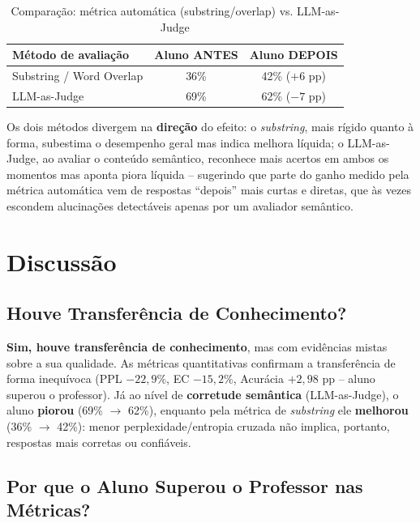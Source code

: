 \documentclass[12pt, a4paper]{article}
\begin{document}
\begin{table}[H]
\centering
\caption{Comparação: métrica automática (substring/overlap) vs. LLM-as-Judge}
\begin{tabular}{lcc}
\toprule
\textbf{Método de avaliação} & \textbf{Aluno ANTES} & \textbf{Aluno DEPOIS} \\
\midrule
Substring / Word Overlap & 36\% & 42\% ($+6$ pp) \\
LLM-as-Judge             & 69\% & 62\% ($-7$ pp) \\
\bottomrule
\end{tabular}
\end{table}

Os dois métodos divergem na \textbf{direção} do efeito: o \textit{substring}, mais
rígido quanto à forma, subestima o desempenho geral mas indica melhora líquida; o
LLM-as-Judge, ao avaliar o conteúdo semântico, reconhece mais acertos em ambos os
momentos mas aponta piora líquida -- sugerindo que parte do ganho medido pela métrica
automática vem de respostas ``depois'' mais curtas e diretas, que às vezes escondem
alucinações detectáveis apenas por um avaliador semântico.

\section{Discussão}

\subsection{Houve Transferência de Conhecimento?}

\begin{destaquebox}
\textbf{Sim, houve transferência de conhecimento}, mas com evidências mistas sobre a
sua qualidade. As métricas quantitativas confirmam a transferência de forma
inequívoca (PPL $-22{,}9\%$, EC $-15{,}2\%$, Acurácia $+2{,}98$ pp -- aluno superou o
professor). Já ao nível de \textbf{corretude semântica} (LLM-as-Judge), o aluno
\textbf{piorou} (69\% $\rightarrow$ 62\%), enquanto pela métrica de
\textit{substring} ele \textbf{melhorou} (36\% $\rightarrow$ 42\%): menor
perplexidade/entropia cruzada não implica, portanto, respostas mais corretas ou
confiáveis.
\end{destaquebox}

\subsection{Por que o Aluno Superou o Professor nas Métricas?}
\end{document}

